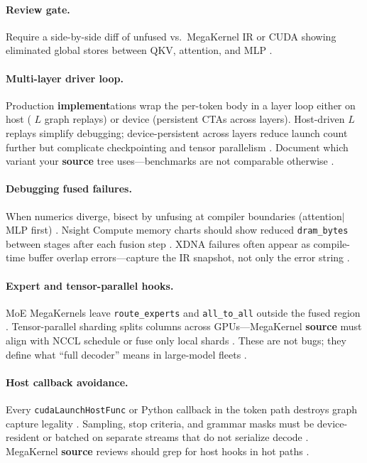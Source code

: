 \paragraph{Review gate.} Require a side-by-side diff of unfused vs.\ MegaKernel IR or CUDA showing eliminated global stores between QKV, attention, and MLP \citep{chen2020compilerbasedhardw,memoryfloor2026}.

\paragraph{Multi-layer driver loop.} Production \textbf{implement}ations wrap the per-token body in a layer loop either on host ( $L$ graph replays) or device (persistent CTAs across layers). Host-driven $L$ replays simplify debugging; device-persistent across layers reduce launch count further but complicate checkpointing and tensor parallelism \citep{patel2025llminference,liu2024deepseekv3}. Document which variant your \textbf{source} tree uses---benchmarks are not comparable otherwise \citep{taxbreak2026,memoryfloor2026}.

\paragraph{Debugging fused failures.} When numerics diverge, bisect by unfusing at compiler boundaries (attention$\mid$MLP first) \citep{yirage2026,chen2020compilerbasedhardw}. Nsight Compute memory charts should show reduced \texttt{dram\_bytes} between stages after each fusion step \citep{semianalysis2024tma,memoryfloor2026}. XDNA failures often appear as compile-time buffer overlap errors---capture the IR snapshot, not only the error string \citep{amd2024aie,amd2024xdna}.

\paragraph{Expert and tensor-parallel hooks.} MoE MegaKernels leave \texttt{route\_experts} and \texttt{all\_to\_all} outside the fused region \citep{liu2024deepseekv3,taxbreak2026}. Tensor-parallel sharding splits columns across GPUs---MegaKernel \textbf{source} must align with NCCL schedule or fuse only local shards \citep{patel2025llminference,kwon2023vllm}. These are not bugs; they define what ``full decoder'' means in large-model fleets \citep{liu2024deepseekv3}.

\paragraph{Host callback avoidance.} Every \texttt{cudaLaunchHostFunc} or Python callback in the token path destroys graph capture legality \citep{nvidia2024cudagraphs,memoryfloor2026}. Sampling, stop criteria, and grammar masks must be device-resident or batched on separate streams that do not serialize decode \citep{kwon2023vllm,patel2025llminference}. MegaKernel \textbf{source} reviews should grep for host hooks in hot paths \citep{taxbreak2026,yirage2026}.

